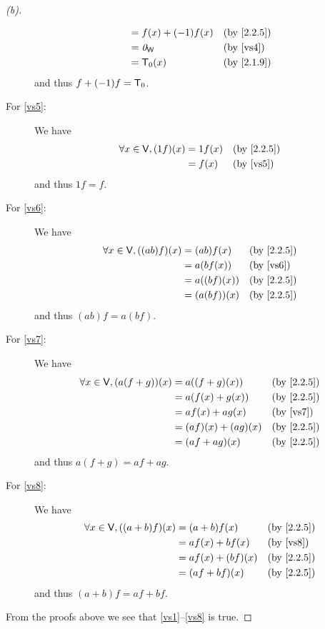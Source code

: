 \begin{proof}[(b)]
\begin{description}
\begin{align*}
                                           & = f(x) + (-1)f(x)   &  & \text{(by \cref{2.2.5})} \\
                                           & = \zv_{\W}          &  & \text{(by \ref{vs4})}    \\
                                           & = \zT(x)            &  & \text{(by \cref{2.1.9})}
      \end{align*}
      and thus \(f + (-1)f = \mathsf{T}_0\).
    \item[For \ref{vs5}:] We have
      \begin{align*}
        \forall x \in \V, (1f)(x) & = 1f(x) &  & \text{(by \cref{2.2.5})} \\
                                  & = f(x)  &  & \text{(by \ref{vs5})}
      \end{align*}
      and thus \(1f = f\).
    \item[For \ref{vs6}:] We have
      \begin{align*}
        \forall x \in \V, ((ab)f)(x) & = (ab) f(x)   &  & \text{(by \cref{2.2.5})} \\
                                     & = a (bf(x))   &  & \text{(by \ref{vs6})}    \\
                                     & = a ((bf)(x)) &  & \text{(by \cref{2.2.5})} \\
                                     & = (a (bf))(x) &  & \text{(by \cref{2.2.5})}
      \end{align*}
      and thus \((ab)f = a (bf)\).
    \item[For \ref{vs7}:] We have
      \begin{align*}
        \forall x \in \V, (a(f + g))(x) & = a((f + g)(x))     &  & \text{(by \cref{2.2.5})} \\
                                        & = a(f(x) + g(x))    &  & \text{(by \cref{2.2.5})} \\
                                        & = af(x) + ag(x)     &  & \text{(by \ref{vs7})}    \\
                                        & = (af)(x) + (ag)(x) &  & \text{(by \cref{2.2.5})} \\
                                        & = (af + ag)(x)      &  & \text{(by \cref{2.2.5})}
      \end{align*}
      and thus \(a(f + g) = af + ag\).
    \item[For \ref{vs8}:] We have
      \begin{align*}
        \forall x \in \V, ((a + b)f)(x) & = (a + b) f(x)    &  & \text{(by \cref{2.2.5})} \\
                                        & = af(x) + bf(x)   &  & \text{(by \ref{vs8})}    \\
                                        & = af(x) + (bf)(x) &  & \text{(by \cref{2.2.5})} \\
                                        & = (af + bf)(x)    &  & \text{(by \cref{2.2.5})}
      \end{align*}
      and thus \((a + b)f = af + bf\).
  \end{description}
  From the proofs above we see that \ref{vs1}--\ref{vs8} is true.


\end{proof}
